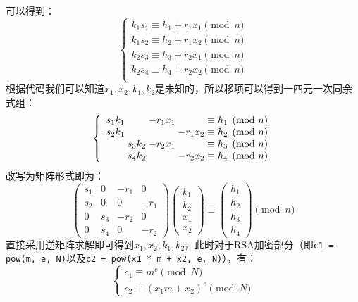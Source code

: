 \documentclass{book}
\numberwithin{equation}{subsubsection}
\begin{document}
可以得到：
\begin{equation}
    \begin{cases}
        k_1s_1\equiv h_1+r_1x_1\pmod{n}\\
        k_1s_2\equiv h_2+r_1x_2\pmod{n}\\
        k_2s_3\equiv h_3+r_2x_1\pmod{n}\\
        k_2s_4\equiv h_4+r_2x_2\pmod{n}\\
    \end{cases}
    \nonumber
\end{equation}
根据代码我们可以知道$x_1,x_2,k_1,k_2$是未知的，所以移项可以得到一四元一次同余式组：
\begin{equation}
    \left\{
    \begin{array}{r @{\;} r @{\;} r @{\;} c @{\;} l}
        s_1k_1&&-r_1x_1&&\equiv h_1\pmod{n}\\
        s_2k_1&&&-r_1x_2&\equiv h_2\pmod{n}\\
        &s_3k_2&-r_2x_1&&\equiv h_3\pmod{n}\\
        &s_4k_2&&-r_2x_2&\equiv h_4\pmod{n}
    \end{array}
    \right.
    \nonumber
\end{equation}
改写为矩阵形式即为：
\begin{equation}
    \left(
        \begin{matrix}
            s_1&0&-r_1&0\\
            s_2&0&0&-r_1\\
            0&s_3&-r_2&0\\
            0&s_4&0&-r_2
        \end{matrix}
    \right)
    \left(
        \begin{matrix}
            k_1\\k_2\\x_1\\x_2
        \end{matrix}
    \right)\equiv
    \left(
        \begin{matrix}
            h_1\\h_2\\h_3\\h_4
        \end{matrix}
    \right)\pmod{n}
    \nonumber
\end{equation}
直接采用逆矩阵求解即可得到$x_1,x_2,k_1,k_2$，此时对于RSA加密部分（即\texttt{c1 = pow(m, e, N)}以及\texttt{c2 = pow(x1 * m + x2, e, N)}），有：
\begin{equation}
    \begin{cases}
        c_1\equiv m^e\pmod{N}\\
        c_2\equiv (x_1m+x_2)^e\pmod{N}
    \end{cases}
    \nonumber
\end{equation}
\end{document}
